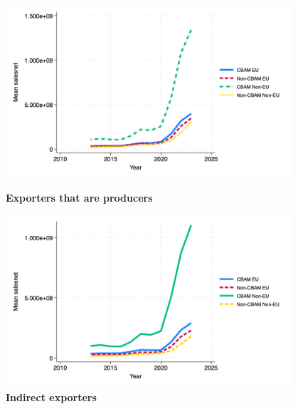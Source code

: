 \documentclass{article}
\begin{document}
\begin{figure}[H]
\centering
\includegraphics[width=0.95\textwidth]{salesnet_ep.png}
\caption{\textbf{Exporters that are producers}}
\includegraphics[width=0.95\textwidth]{salesnet_indir.png}
\caption{\textbf{Indirect exporters}}
\end{figure}
\end{document}
